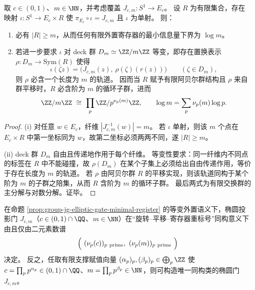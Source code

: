 \begin{proposition}[\(m\)-折椭圆投影的最小寄存器与素因子强制性]\label{prop:group-jg-elliptic-gate-minimal-register}
取 \(c\in(0,1)\)、\(m\in\NN\)，并考虑覆盖 \(J_{c,m}:S^1\to E_c\)。
设 \(R\) 为有限集合，存在映射 \(\iota:S^1\to E_c\times R\) 使 \(\pi_{E_c}\circ\iota=J_{c,m}\) 且 \(\iota\) 为单射。
则：
\begin{enumerate}
  \item 必有 \(|R|\ge m\)，从而任何有限外置寄存器的最小信息量下界为 \(\log m\)。
  \item 若进一步要求 \(\iota\) 对 deck 群 \(D_m\simeq\ZZ/m\ZZ\) 等变，即存在置换表示 \(\rho:D_m\to\mathrm{Sym}(R)\) 使得
  \[
  \iota(\zeta z)=\bigl(J_{c,m}(z),\ \rho(\zeta)(r(z))\bigr)\qquad(\zeta\in D_m),
  \]
  则 \(\rho\) 必含一个长度为 \(m\) 的轨道。
  因而当 \(R\) 赋予有限阿贝尔群结构且 \(\rho\) 来自群平移时，\(R\) 必含阶为 \(m\) 的循环子群，进而
  \[
  \ZZ/m\ZZ\ \cong\ \prod_{p}\ZZ/p^{\nu_p(m)}\ZZ,
  \qquad
  \log m=\sum_p \nu_p(m)\log p.
  \]
\end{enumerate}
\end{proposition}

\begin{proof}
(i) 对任意 \(w\in E_c\)，纤维 \(|J_{c,m}^{-1}(w)|=m\)。
若 \(\iota\) 单射，则该 \(m\) 个点在 \(E_c\times R\) 中第一坐标同为 \(w\)，故第二坐标必须两两不同，遂 \(|R|\ge m\)。
\par
(ii) deck 群 \(D_m\) 自由且传递地作用于每个纤维。
等变性要求：同一纤维内不同点的标签在 \(R\) 中不能碰撞，故 \(\rho(D_m)\) 在某个子集上必须给出自由传递作用，等价于存在长度为 \(m\) 的轨道。
若 \(\rho\) 由阿贝尔群 \(R\) 的平移实现，则该轨道同构于某个阶为 \(m\) 的子群之陪集，从而 \(R\) 含阶为 \(m\) 的循环子群。
最后两式为有限交换群的主分解与对数分解。证毕。
\end{proof}

\begin{corollary}[有理椭圆投影门的素数谱分类]\label{cor:group-jg-elliptic-gate-prime-spectrum-classification}
在命题 \ref{prop:group-jg-elliptic-gate-minimal-register} 的等变外置语义下，椭圆投影门 \(J_{c,m}\)（\(c\in(0,1)\cap\QQ\)、\(m\in\NN\)）在“旋转--平移--寄存器重标号”同构意义下由且仅由二元素数谱
\[
\Bigl(\ (\nu_p(c))_{p\ \mathrm{prime}},\ (\nu_p(m))_{p\ \mathrm{prime}}\ \Bigr)
\]
决定。
反之，任取有限支撑赋值向量 \((\alpha_p)_p,(\beta_p)_p\in\bigoplus_p\ZZ\) 使
\(
c=\prod_p p^{\alpha_p}\in(0,1)\cap\QQ
\)、\(
m=\prod_p p^{\beta_p}\in\NN
\)，则可构造唯一同构类的椭圆门 \(J_{c,m}\)。
\end{corollary}

